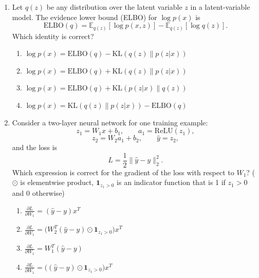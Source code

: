 \documentclass[11pt]{article}
\newcommand{\cmark}{\ding{51}}
\begin{document}
\begin{enumerate}[leftmargin=*]
\begin{enumerate}[label=\Alph*.]
    \item Because the logarithm turns the sum over mixture components into a product
    \item Because introducing latent component indicators makes the complete-data log-likelihood easier to optimize \cmark
    \item Because EM always finds the global maximum of the likelihood
    \item Because the Gaussian covariance matrices do not need to be estimated
\end{enumerate}

\item Let $q(z)$ be any distribution over the latent variable $z$ in a latent-variable model. The evidence lower bound (ELBO) for $\log p(x)$ is
\[
\mathrm{ELBO}(q) = \mathbb{E}_{q(z)}[\log p(x,z)] - \mathbb{E}_{q(z)}[\log q(z)].
\]
Which identity is correct?

\begin{enumerate}[label=\Alph*.]
    \item $\log p(x) = \mathrm{ELBO}(q) - \mathrm{KL}(q(z)\|p(z|x))$
    \item $\log p(x) = \mathrm{ELBO}(q) + \mathrm{KL}(q(z)\|p(z|x))$ \cmark
    \item $\log p(x) = \mathrm{ELBO}(q) + \mathrm{KL}(p(z|x)\|q(z))$
    \item $\log p(x) = \mathrm{KL}(q(z)\|p(z|x)) - \mathrm{ELBO}(q)$
\end{enumerate}

\item Consider a two-layer neural network for one training example:
\[
z_1 = W_1 x + b_1,\qquad a_1 = \mathrm{ReLU}(z_1),
\]
\[
z_2 = W_2 a_1 + b_2,\qquad \hat y = z_2,
\]
and the loss is
\[
L = \frac{1}{2}\|\hat y - y\|_2^2.
\]
Which expression is correct for the gradient of the loss with respect to $W_1$? ($\odot$ is elementwise product, $\mathbf{1}_{z_1>0}$ is an indicator function that is 1 if $z_1>0$ and 0 otherwise)

\begin{enumerate}[label=\Alph*.]
    \item \(\displaystyle \frac{\partial L}{\partial W_1} = (\hat y - y)x^T\)
    \item \(\displaystyle \frac{\partial L}{\partial W_1} = \bigl(W_2^T(\hat y-y)\odot \mathbf{1}_{z_1>0}\bigr)x^T\) \cmark
    \item \(\displaystyle \frac{\partial L}{\partial W_1} = W_1^T(\hat y-y)\)
    \item \(\displaystyle \frac{\partial L}{\partial W_1} = \bigl((\hat y-y)\odot \mathbf{1}_{z_1>0}\bigr)x^T\)
\end{enumerate}


\end{enumerate}
\end{document}
